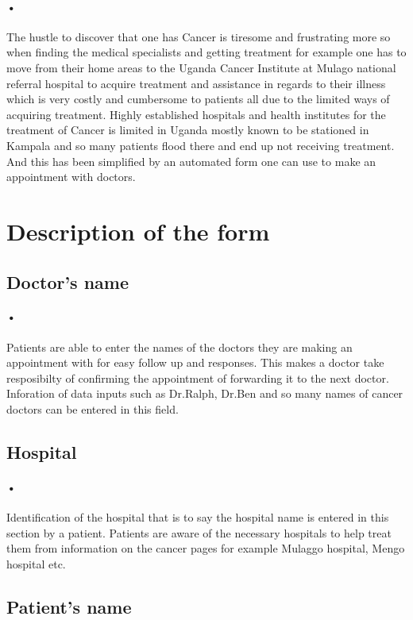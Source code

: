 \documentclass[12pt]{article}
\begin{document}
\paragraph{•}The hustle to discover that one has Cancer is tiresome and frustrating more so when finding the medical specialists and getting treatment for example one has to move from their home areas to the Uganda Cancer Institute at Mulago national referral hospital to acquire treatment and assistance in regards to their illness which is very costly and cumbersome to patients all due to the limited ways of acquiring treatment. Highly established hospitals and health institutes for the treatment of Cancer is limited in Uganda mostly known to be stationed in Kampala and so many patients flood there and end up not receiving treatment. And this has been simplified by an automated form one can use to make an appointment with doctors.

\section{Description of the form}
\subsection{Doctor's name}
\paragraph{•} Patients are able to enter the names of the doctors they are making an appointment with for easy follow up and responses. This makes a doctor take resposibilty of confirming the appointment of forwarding it to the next doctor. Inforation of data inputs such as Dr.Ralph, Dr.Ben and so many names of cancer doctors can be entered in this field.

\subsection{Hospital}
\paragraph{•} Identification of the hospital that is to say the hospital name is entered in this section by a patient. Patients are aware of the necessary hospitals to help treat them from information on the cancer pages for example Mulaggo hospital, Mengo hospital etc.

\subsection{Patient's name}
\end{document}
